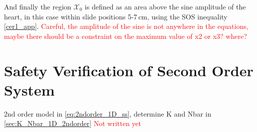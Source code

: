 And finally the region $\mathcal{X}_0$ is defined as an area above the sine amplitude of the heart, in this case within slide positions 5-7\,cm, using the SOS inequality \autoref{cer1_app}. 
\textcolor{red}{Careful, the amplitude of the sine is not anywhere in the equations, maybe there should be a constraint on the maximum value of x2 or x3? where?}

\section{Safety Verification of Second Order System}
2nd order model in \autoref{eq:2ndorder_1D_ss}, determine K and Nbar in \autoref{sec:K_Nbar_1D_2ndorder} \textcolor{red}{Not written yet}